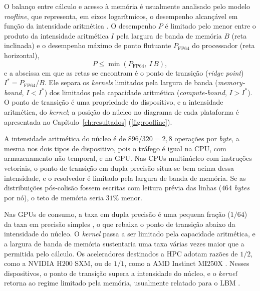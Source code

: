 O balanço entre cálculo e acesso à memória é usualmente analisado pelo modelo \textit{roofline}, que representa, em eixos logarítmicos, o desempenho alcançável em função da intensidade aritmética \parencite{Williams2009}.
O desempenho $P$ é limitado pelo menor entre o produto da intensidade aritmética $I$ pela largura de banda de memória $B$ (reta inclinada) e o desempenho máximo de ponto flutuante $P_{\mathrm{FP64}}$ do processador (reta horizontal),
\begin{equation}
    P \le \min\left( P_{\mathrm{FP64}},\ I\, B \right),
    \label{eq:roofline}
\end{equation}
e a abscissa em que as retas se encontram é o ponto de transição (\textit{ridge point}) $I^{\ast} = P_{\mathrm{FP64}}/B$.
Ele separa os \textit{kernels} limitados pela largura de banda (\textit{memory-bound}, $I < I^{\ast}$) dos limitados pela capacidade aritmética (\textit{compute-bound}, $I > I^{\ast}$).
O ponto de transição é uma propriedade do dispositivo, e a intensidade aritmética, do \textit{kernel}; a posição do núcleo no diagrama de cada plataforma é apresentada no Capítulo~\ref{ch:resultados} (\autoref{fig:roofline}). %

A intensidade aritmética do núcleo é de $896/320 = 2{,}8$ operações por \textit{byte}, a mesma nos dois tipos de dispositivo, pois o tráfego é igual na CPU, com armazenamento não temporal, e na GPU.
Nas CPUs multinúcleo com instruções vetoriais, o ponto de transição em dupla precisão situa-se bem acima dessa intensidade, e o resolvedor é limitado pela largura de banda de memória.
Se as distribuições pós-colisão fossem escritas com leitura prévia das linhas ($464$ \textit{bytes} por nó), o teto de memória seria $31\%$ menor.

Nas GPUs de consumo, a taxa em dupla precisão é uma pequena fração ($1/64$) da taxa em precisão simples \parencite{NVIDIA2025RTXBlackwell}, o que rebaixa o ponto de transição abaixo da intensidade do núcleo.
O \textit{kernel} passa a ser limitado pela capacidade aritmética, e a largura de banda de memória sustentaria uma taxa várias vezes maior que a permitida pelo cálculo.
Os aceleradores destinados a HPC adotam razões de $1/2$, como a NVIDIA H200 SXM, ou de $1/1$, como a AMD Instinct MI250X \parencite{NVIDIA2024H200, AMD2026MI250X}.
Nesses dispositivos, o ponto de transição supera a intensidade do núcleo, e o \textit{kernel} retorna ao regime limitado pela memória, usualmente relatado para o LBM \parencite{Tomczak2021}.

